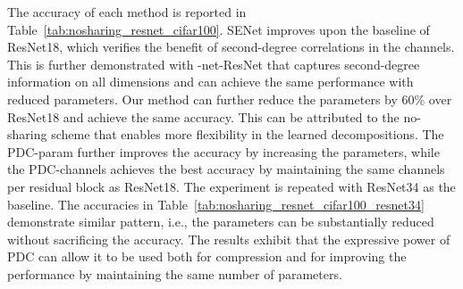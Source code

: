 \documentclass[runningheads]{llncs}
\newcommand{\resnet}{ResNet}
\newcommand{\modelres}{-net-\resnet}
\newcommand{\sne}{SENet}
\newcommand{\noshare}{PDC}
\providecommand\ie{i.e.,}
\begin{document}
The accuracy of each method is reported in Table~\ref{tab:nosharing_resnet_cifar100}. \sne{} improves upon the baseline of \resnet18, which verifies the benefit of second-degree correlations in the channels. This is further demonstrated with \modelres{} that captures second-degree information on all dimensions and can achieve the same performance with reduced parameters. Our method can further reduce the parameters by 60\% over \resnet18 and achieve the same accuracy. This can be attributed to the no-sharing scheme that enables more flexibility in the learned decompositions. The \noshare-param further improves the accuracy by increasing the parameters, while the \noshare-channels achieves the best accuracy by maintaining the same channels per residual block as \resnet18. The experiment is repeated with \resnet34 as the baseline. The accuracies in Table~\ref{tab:nosharing_resnet_cifar100_resnet34} demonstrate similar pattern, \ie{} the parameters can be substantially reduced without sacrificing the accuracy. The results exhibit that the expressive power of \noshare{} can allow it to be used both for compression and for improving the performance by maintaining the same number of parameters. 
\end{document}
